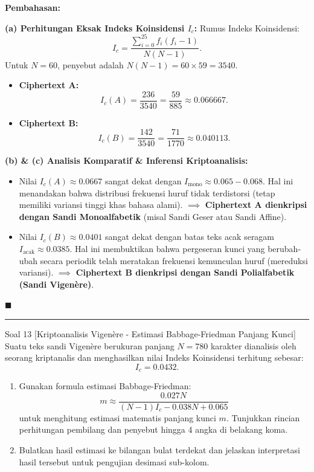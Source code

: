 \documentclass[11pt,a4paper]{article}
\newenvironment{solusi}{\noindent\textbf{\textsf{Pembahasan:}}\par\vspace{0.2em}}{\hfill$\blacksquare$\vspace{1em}\par\hrule\vspace{1em}}
\begin{document}
\begin{solusi}
\textbf{(a) Perhitungan Eksak Indeks Koinsidensi $I_c$:}
Rumus Indeks Koinsidensi:
\[
I_c = \frac{\sum_{i=0}^{25} f_i(f_i - 1)}{N(N - 1)}.
\]
Untuk $N = 60$, penyebut adalah $N(N - 1) = 60 \times 59 = 3540$.
\begin{itemize}[leftmargin=*]
    \item \textbf{Ciphertext A:}
    \[
    I_c(A) = \frac{236}{3540} = \frac{59}{885} \approx \mathbf{0.066667}.
    \]
    \item \textbf{Ciphertext B:}
    \[
    I_c(B) = \frac{142}{3540} = \frac{71}{1770} \approx \mathbf{0.040113}.
    \]
\end{itemize}

\vspace{0.2cm}
\textbf{(b) \& (c) Analisis Komparatif \& Inferensi Kriptoanalisis:}
\begin{itemize}[leftmargin=*]
    \item Nilai $I_c(A) \approx 0.0667$ sangat dekat dengan $I_{\text{mono}} \approx 0.065 - 0.068$. Hal ini menandakan bahwa distribusi frekuensi huruf tidak terdistorsi (tetap memiliki variansi tinggi khas bahasa alami).
    $\implies$ \textbf{Ciphertext A dienkripsi dengan Sandi Monoalfabetik} (misal Sandi Geser atau Sandi Affine).
    
    \item Nilai $I_c(B) \approx 0.0401$ sangat dekat dengan batas teks acak seragam $I_{\text{acak}} \approx 0.0385$. Hal ini membuktikan bahwa pergeseran kunci yang berubah-ubah secara periodik telah meratakan frekuensi kemunculan huruf (mereduksi variansi).
    $\implies$ \textbf{Ciphertext B dienkripsi dengan Sandi Polialfabetik (Sandi Vigenère)}.
\end{itemize}
\end{solusi}


\begin{soalanalisis}{Soal 13 [Kriptoanalisis Vigenère - Estimasi Babbage-Friedman Panjang Kunci]}
Suatu teks sandi Vigenère berukuran panjang $N = 780$ karakter dianalisis oleh seorang kriptanalis dan menghasilkan nilai Indeks Koinsidensi terhitung sebesar:
\[
I_c = 0.0432.
\]
\begin{enumerate}[label=(\alph*)]
    \item Gunakan formula estimasi Babbage-Friedman:
    \[
    m \approx \frac{0.027 N}{(N - 1)I_c - 0.038 N + 0.065}
    \]
    untuk menghitung estimasi matematis panjang kunci $m$. Tunjukkan rincian perhitungan pembilang dan penyebut hingga 4 angka di belakang koma.
    \item Bulatkan hasil estimasi ke bilangan bulat terdekat dan jelaskan interpretasi hasil tersebut untuk pengujian desimasi sub-kolom.
\end{enumerate}
\end{soalanalisis}
\end{document}
